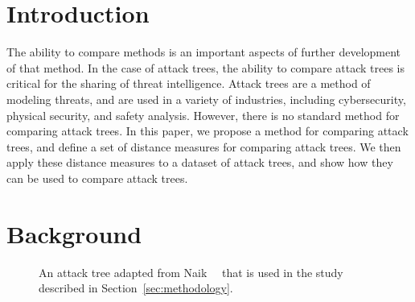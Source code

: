

\section{Introduction}
\label{sec:introduction}

The ability to compare methods is an important aspects of further development of that method. In the case of attack trees, the ability to compare attack trees is critical for the sharing of threat intelligence. Attack trees are a method of modeling threats, and are used in a variety of industries, including cybersecurity, physical security, and safety analysis. However, there is no standard method for comparing attack trees. In this paper, we propose a method for comparing attack trees, and define a set of distance measures for comparing attack trees. We then apply these distance measures to a dataset of attack trees, and show how they can be used to compare attack trees.



\section{Background}
\label{sec:background}





\begin{figure*}
\caption{An attack tree adapted from Naik~\etal~\cite{naikEvaluationPotentialAttack2022} that is used in the study described in Section~\ref{sec:methodology}. }
    \label{fig:tartgetAT}
\end{figure*}

